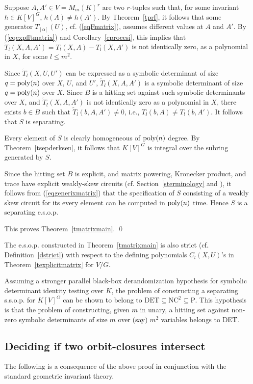 \documentclass[11pt]{article}
\begin{document}
Suppose $A,A' \in V=M_m(K)^r$ are two $r$-tuples such that,
for some invariant $h \in K[V]^G$, $h(A) \not = h(A')$. 
By Theorem~\ref{tprf}, it  follows that some generator $T_{[\alpha]}(U)$, cf. (\ref{eqFmatrix}), 
assumes different values at $A$ and $A'$. 
By (\ref{eqexpfftmatrix}) and Corollary~\ref{cprocesi}, 
this implies that  $\tilde T_l(X,A,A')=T_l(X,A)-T_l(X,A')$
is not identically zero, as a polynomial in $X$, for some $l \le m^2$.

Since $\tilde T_l(X,U,U')$ can be expressed as a symbolic determinant 
of size $q={\mbox {poly}}(n)$  over $X$, $U$, and $U'$, $\tilde T_l(X,A,A')$ is a symbolic determinant of size $q={\mbox {poly}}(n)$ over $X$.
Since $B$ is a hitting set against such symbolic determinants over $X$, 
and $\tilde T_l(X,A,A')$ is not identically zero as a polynomial in $X$,
there exists $b \in B$ such that $\tilde T_l(b,A,A') \not = 0$, i.e.,
$T_l(b,A) \not = T_l(b,A')$. It follows that $S$ is separating. 

Every element of $S$ is clearly homogeneous of ${\mbox {poly}}(n)$ degree.
By Theorem~\ref{tsepderksen}, it follows that
$K[V]^G$ is integral over the subring generated by $S$.

Since the hitting set $B$ is explicit,
and matrix powering, Kronecker product,  and trace  
have  explicit weakly-skew circuits  (cf. Section~\ref{sterminology} and \cite{malod}), 
it follows from (\ref{eqgenerixmatrix}) that the specification of $S$ consisting of a weakly 
skew  circuit
for its every element can be computed in ${\mbox {poly}}(n)$ time. Hence $S$ is  a separating  e.s.o.p.  

This proves Theorem~\ref{tmatrixmain}. \qed 

 The e.s.o.p. constructed in Theorem~\ref{tmatrixmain} is also 
strict (cf. Definition~\ref{dstrict}) with respect to the defining 
polynomials $C_l(X,U)$'s in Theorem~\ref{texplicitmatrix} for $V/G$.


Assuming a stronger  parallel black-box derandomization hypothesis for symbolic determinant identity testing over $K$, 
the problem of constructing 
a separating   s.s.o.p. for $K[V]^G$ can be shown to belong to $\mbox{DET} \subseteq \mbox{NC}^2 \subseteq \mbox{P}$.
This hypothesis is that the problem
of constructing, given $m$ in unary, 
a hitting set against non-zero symbolic determinants of size $m$ over (say) $m^2$   variables 
belongs to DET.

\subsection{Deciding if two orbit-closures intersect}
The following is a consequence of the above proof in conjunction with  the standard geometric invariant theory.
\end{document}
